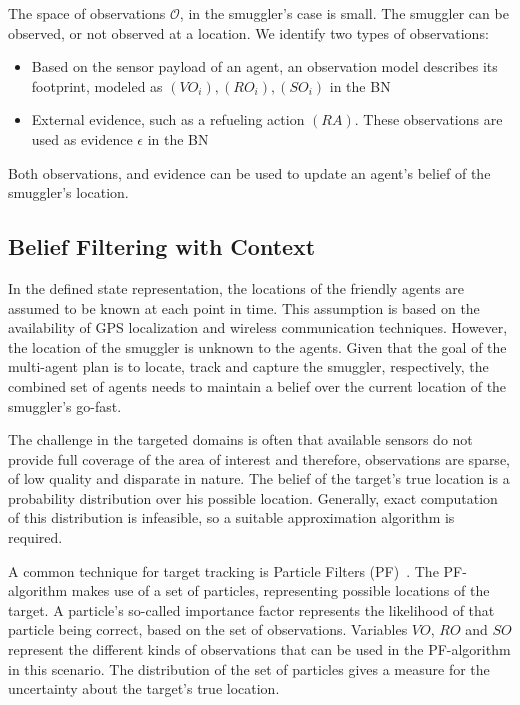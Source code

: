 \documentclass[conference]{IEEEtran}
\begin{document}
The space of observations $\mathcal{O}$, in the smuggler's case is small. The smuggler can be observed, or not observed at a location. We identify two types of observations:
\begin{itemize}
\item Based on the sensor payload of an agent, an observation model describes its footprint, modeled as $(VO_i), (RO_i), (SO_i)$ in the BN
\item External evidence, such as a refueling action $(RA)$. These observations are used as evidence $\epsilon$ in the BN
\end{itemize}
Both observations, and evidence can be used to update an agent's belief of the smuggler's location.

\subsection{Belief Filtering with Context}
\label{subsec:belief-filter}

In the defined state representation, the locations of the friendly agents are assumed to be known at each point in time. This assumption is based on the availability of GPS localization and wireless communication techniques. However, the location of the smuggler is unknown to the agents. Given that the goal of the multi-agent plan is to locate, track and capture the smuggler, respectively, the combined set of agents needs to maintain a belief over the current location of the smuggler's go-fast.

The challenge in the targeted domains is often that available sensors do not provide full coverage of the area of interest and therefore, observations are sparse, of low quality and disparate in nature. The belief of the target's true location is a probability distribution over his possible location. Generally, exact computation of this distribution is infeasible, so a suitable approximation algorithm is required.

A common technique for target tracking is Particle Filters (PF)~\cite{Blackman1999}. The PF-algorithm makes use of a set of particles, representing possible locations of the target. A particle's so-called importance factor represents the likelihood of that particle being correct, based on the set of observations. Variables $VO$, $RO$ and $SO$ represent the different kinds of observations that can be used in the PF-algorithm in this scenario. The distribution of the set of particles gives a measure for the uncertainty about the target's true location.
\end{document}
